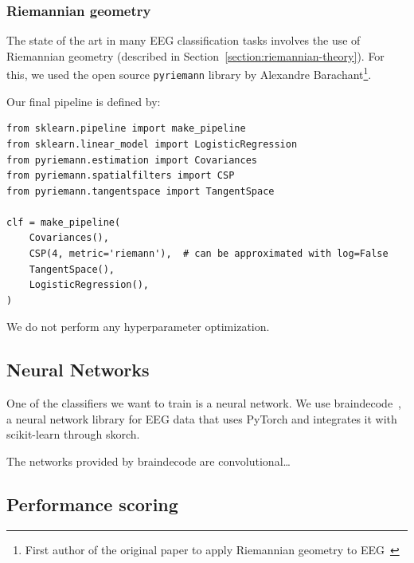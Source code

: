 
        \subsubsection{Riemannian geometry}

            The state of the art in many EEG classification tasks involves the use of Riemannian geometry (described in Section~\ref{section:riemannian-theory}). For this, we used the open source \texttt{pyriemann} library by Alexandre Barachant\footnote{First author of the original paper to apply Riemannian geometry to EEG~\cite{barachant_classification_2013}}.

            Our final pipeline is defined by:

\begin{verbatim}
from sklearn.pipeline import make_pipeline
from sklearn.linear_model import LogisticRegression
from pyriemann.estimation import Covariances
from pyriemann.spatialfilters import CSP
from pyriemann.tangentspace import TangentSpace

clf = make_pipeline(
    Covariances(),
    CSP(4, metric='riemann'),  # can be approximated with log=False
    TangentSpace(),
    LogisticRegression(),
)
\end{verbatim}

            We do not perform any hyperparameter optimization.


    \subsection{Neural Networks}


        One of the classifiers we want to train is a neural network. We use braindecode~\cite{schirrmeister_deep_2017}\cite{noauthor_braindecode_2021}, a neural network library for EEG data that uses PyTorch and integrates it with scikit-learn through skorch.

        The networks provided by braindecode are convolutional\ldots

    \subsection{Performance scoring}

